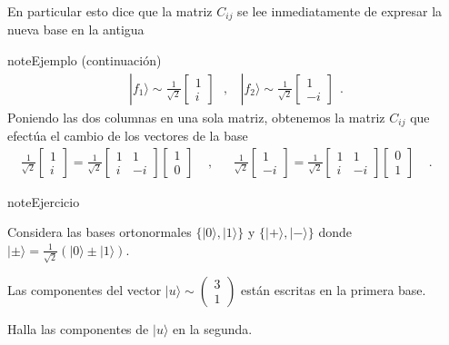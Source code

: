 \documentclass[letterpaper,10pt,english]{jupyterBook}
\newcommand{\ket}[1]{|#1\rangle}
\begin{document}
\sphinxAtStartPar
En particular esto dice que la matriz \(C_{ij}\) se lee inmediatamente de expresar la nueva base en la antigua

\begin{sphinxadmonition}{note}{Ejemplo (continuación) }
\begin{equation*}
\begin{split}
\ket{f_1} \sim \frac{1}{\sqrt{2}}\begin{bmatrix} 1 \\i \end{bmatrix}~~~,~~~~
\ket{f_2} \sim \frac{1}{\sqrt{2}}\begin{bmatrix} 1 \\-i \end{bmatrix}~~.
\end{split}
\end{equation*}
\sphinxAtStartPar
Poniendo las dos columnas en una sola matriz, obtenemos  la matriz \(C_{ij}\) que efectúa el cambio de los vectores de la base
\begin{equation*}
\begin{split}
 \frac{1}{\sqrt{2}}\begin{bmatrix} 1 \\i \end{bmatrix} = \frac{1}{\sqrt{2}}\begin{bmatrix} 1 & 1 \\ i & -i \end{bmatrix}\begin{bmatrix} 1 \\0 \end{bmatrix}~~~~~,~~~~~~~
\frac{1}{\sqrt{2}}\begin{bmatrix} 1 \\-i \end{bmatrix} = \frac{1}{\sqrt{2}}\begin{bmatrix} 1 & 1 \\ i & -i \end{bmatrix}\begin{bmatrix} 0 \\1 \end{bmatrix}~~~~~.~~~~~~~
\end{split}
\end{equation*}\end{sphinxadmonition}

\begin{sphinxadmonition}{note}{Ejercicio}

\sphinxAtStartPar
Considera las bases ortonormales \(\{\ket{0},\ket{1}\}\) y \(\{\ket{+},\ket{-}\}\) donde \(\ket{\pm} = \frac{1}{\sqrt{2}}(\ket{0} \pm \ket{1})\).

\sphinxAtStartPar
Las componentes del vector \(\ket{u} \sim \begin{pmatrix}3\\1\end{pmatrix}\) están escritas en la primera base.

\sphinxAtStartPar
Halla las componentes de \(\ket{u}\) en la segunda.
\end{sphinxadmonition}
\end{document}

